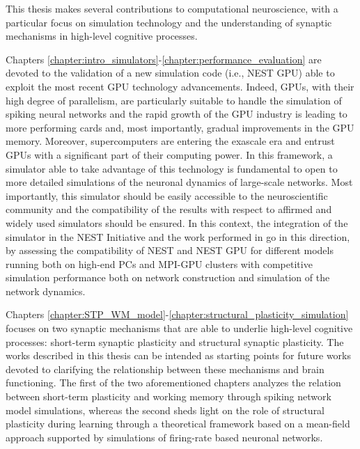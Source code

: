 \documentclass[a4paper, 12pt, twoside, openright]{book}
\begin{document}
This thesis makes several contributions to computational neuroscience, with a particular focus on simulation technology and the understanding of synaptic mechanisms in high-level cognitive processes.

Chapters \ref{chapter:intro_simulators}-\ref{chapter:performance_evaluation} are devoted to the validation of a new simulation code (i.e., NEST GPU) able to exploit the most recent GPU technology advancements. Indeed, GPUs, with their high degree of parallelism, are particularly suitable to handle the simulation of spiking neural networks and the rapid growth of the GPU industry is leading to more performing cards and, most importantly, gradual improvements in the GPU memory. Moreover, supercomputers are entering the exascale era and entrust GPUs with a significant part of their computing power. In this framework, a simulator able to take advantage of this technology is fundamental to open to more detailed simulations of the neuronal dynamics of large-scale networks. Most importantly, this simulator should be easily accessible to the neuroscientific community and the compatibility of the results with respect to affirmed and widely used simulators should be ensured. In this context, the integration of the simulator in the NEST Initiative and the work performed in \cite{Golosio2021, Tiddia2022, Golosio2023} go in this direction, by assessing the compatibility of NEST and NEST GPU for different models running both on high-end PCs and MPI-GPU clusters with competitive simulation performance both on network construction and simulation of the network dynamics.


Chapters \ref{chapter:STP_WM_model}-\ref{chapter:structural_plasticity_simulation} focuses on two synaptic mechanisms that are able to underlie high-level cognitive processes: short-term synaptic plasticity and structural synaptic plasticity. The works described in this thesis can be intended as starting points for future works devoted to clarifying the relationship between these mechanisms and brain functioning. The first of the two aforementioned chapters analyzes the relation between short-term plasticity and working memory through spiking network model simulations, whereas the second sheds light on the role of structural plasticity during learning through a theoretical framework based on a mean-field approach supported by simulations of firing-rate based neuronal networks.
\end{document}
